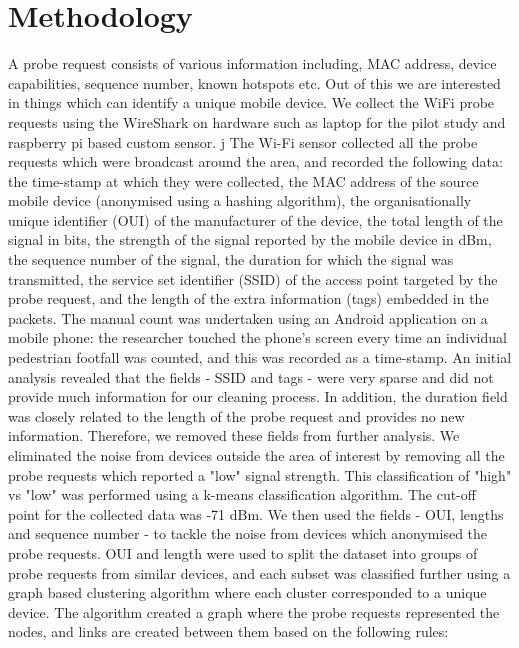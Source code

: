 \documentclass[11t, a4paper, twocolumn]{article}
\begin{document}
	\section{Methodology}
		A probe request consists of various information including, MAC address, device capabilities, sequence number, known hotspots etc. Out of this we are interested in things which can identify a unique mobile device. We collect the WiFi probe requests using the WireShark on hardware such as laptop for the pilot study and raspberry pi based custom sensor. j
		The Wi-Fi sensor collected all the probe requests which were broadcast around the area, and recorded the following data: the time-stamp at which they were collected, the MAC address of the source mobile device (anonymised using a hashing algorithm), the organisationally unique identifier (OUI) of the manufacturer of the device, the total length of the signal in bits, the strength of the signal reported by the mobile device in dBm, the sequence number of the signal, the duration for which the signal was transmitted, the service set identifier (SSID) of the access point targeted by the probe request, and the length of the extra information (tags) embedded in the packets.
		The manual count was undertaken using an Android application on a mobile phone: the researcher touched the phone’s screen every time an individual pedestrian footfall was counted, and this was recorded as a time-stamp. 
			An initial analysis revealed that the fields - SSID and tags - were very sparse and did not provide much information for our cleaning process.
		In addition, the duration field was closely related to the length of the probe request and provides no new information.
		Therefore, we removed these fields from further analysis.
		We eliminated the noise from devices outside the area of interest by removing all the probe requests which reported a "low" signal strength.
		This classification of "high" vs "low" was performed using a k-means classification algorithm.
		The cut-off point for the collected data was -71 dBm.
		We then used the fields - OUI, lengths and sequence number - to tackle the noise from devices which anonymised the probe requests.
		OUI and length were used to split the dataset into groups of probe requests from similar devices, and each subset was classified further using a graph based clustering algorithm where each cluster corresponded to a unique device.
		The algorithm created a graph where the probe requests represented the nodes, and links are created between them based on the following rules: 
		
\end{document}
